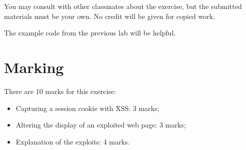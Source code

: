 \documentclass{article}
\begin{document}
You may consult with other classmates about the exercise, but the submitted materials 
must be your own.  No credit will be given for copied work.


The example code from the previous lab will be helpful.

\section{Marking}

There are 10 marks for this exercise:

\begin{itemize}
	\item Capturing a session cookie with XSS: 3 marks;
	\item Altering the display of an exploited web page: 3 marks;
	\item Explanation of the exploits: 4 marks.
\end{itemize}
\end{document}

